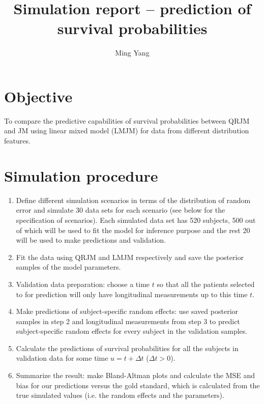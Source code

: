 \documentclass{article}
\begin{document}
\title{Simulation report -- prediction of survival probabilities}
\author{Ming Yang}
\maketitle

\section{Objective}
To compare the predictive capabilities of survival probabilities between QRJM and JM using linear mixed model (LMJM) for data from different distribution features.\par


\section{Simulation procedure}
\begin{enumerate}
\item  Define different simulation scenarios in terms of the distribution of random error and simulate 30 data sets for each scenario (see below for the specification of scenarios). Each simulated data set has 520 subjects, 500 out of which will be used to fit the model for inference purpose and the rest 20 will be used to make predictions and validation.
\item  Fit the data using QRJM and LMJM respectively and save the posterior samples of the model parameters.
\item  Validation data preparation: choose a time $t$ so that all the patients selected to for prediction will only have longitudinal measurements up to this time $t$.
\item  Make predictions of subject-specific random effects: use saved posterior samples in step 2 and longitudinal measurements from step 3 to predict subject-specific random effects for every subject in the validation samples.
\item  Calculate the predictions of survival probabilities for all the subjects in validation data for some time $u = t + \Delta t$ ($\Delta t > 0$).
\item Summarize the result: make Bland-Altman plots and calculate the MSE and bias for our predictions versus the gold standard, which is calculated from the true simulated values (i.e. the random effects and the parameters).
\end{enumerate}
\end{document}
